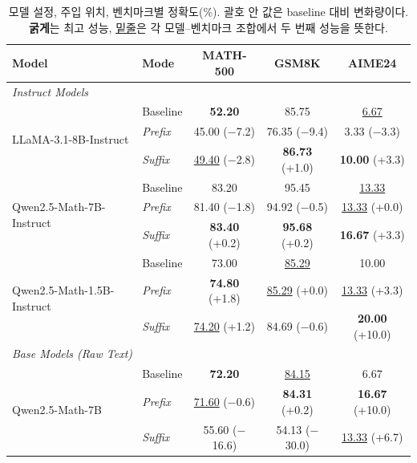 \begin{table}[ht]
\centering
\caption{모델 설정, 주입 위치, 벤치마크별 정확도(\%). 괄호 안 값은 baseline 대비 변화량이다. \textbf{굵게}는 최고 성능, \underline{밑줄}은 각 모델--벤치마크 조합에서 두 번째 성능을 뜻한다.}
\label{tab:performance_full}
\footnotesize
\renewcommand{\arraystretch}{0.9}
\begin{tabular}{ll ccc}
\toprule
\textbf{Model} & \textbf{Mode} & \textbf{MATH-500} & \textbf{GSM8K} & \textbf{AIME24} \\
\midrule
\multicolumn{5}{l}{\textit{Instruct Models}} \\
\midrule
\multirow{3}{*}{LLaMA-3.1-8B-Instruct} & Baseline & \textbf{52.20} & 85.75 & \underline{6.67} \\
 & \emph{Prefix} & 45.00 {\scriptsize($-$7.2)} & 76.35 {\scriptsize($-$9.4)} & 3.33 {\scriptsize($-$3.3)} \\
 & \emph{Suffix} & \underline{49.40} {\scriptsize($-$2.8)} & \textbf{86.73} {\scriptsize(+1.0)} & \textbf{10.00} {\scriptsize(+3.3)} \\
\midrule
\multirow{3}{*}{Qwen2.5-Math-7B-Instruct} & Baseline & 83.20 & 95.45 & \underline{13.33} \\
 & \emph{Prefix} & 81.40 {\scriptsize($-$1.8)} & 94.92 {\scriptsize($-$0.5)} & \underline{13.33} {\scriptsize(+0.0)} \\
 & \emph{Suffix} & \textbf{83.40} {\scriptsize(+0.2)} & \textbf{95.68} {\scriptsize(+0.2)} & \textbf{16.67} {\scriptsize(+3.3)} \\
\midrule
\multirow{3}{*}{Qwen2.5-Math-1.5B-Instruct} & Baseline & 73.00 & \underline{85.29} & 10.00 \\
 & \emph{Prefix} & \textbf{74.80} {\scriptsize(+1.8)} & \underline{85.29} {\scriptsize(+0.0)} & \underline{13.33} {\scriptsize(+3.3)} \\
 & \emph{Suffix} & \underline{74.20} {\scriptsize(+1.2)} & 84.69 {\scriptsize($-$0.6)} & \textbf{20.00} {\scriptsize(+10.0)} \\
\midrule
\multicolumn{5}{l}{\textit{Base Models (Raw Text)}} \\
\midrule
\multirow{3}{*}{Qwen2.5-Math-7B} & Baseline & \textbf{72.20} & \underline{84.15} & 6.67 \\
 & \emph{Prefix} & \underline{71.60} {\scriptsize($-$0.6)} & \textbf{84.31} {\scriptsize(+0.2)} & \textbf{16.67} {\scriptsize(+10.0)} \\
 & \emph{Suffix} & 55.60 {\scriptsize($-$16.6)} & 54.13 {\scriptsize($-$30.0)} & \underline{13.33} {\scriptsize(+6.7)} \\

\end{tabular}
\end{table}
